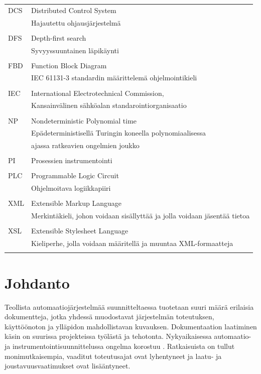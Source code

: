 \documentclass[finnish,12pt]{article}
\begin{document}
	\begin{tabular}{ll}	     	    
DCS	& Distributed Control System \\
	& Hajautettu ohjausjärjestelmä \\ \\
DFS	& Depth-first search\\
	& Syvyyssuuntainen läpikäynti \\\\

FBD	& Function Block Diagram\\
	& IEC 61131-3 standardin määrittelemä ohjelmointikieli\\\\
IEC	& International Electrotechnical Commission,\\
	& Kansainvälinen sähköalan standarointiorganisaatio\\\\
NP & Nondeterministic Polynomial time\\
	& Epädeterministisellä Turingin koneella polynomiaalisessa\\&ajassa ratkeavien ongelmien joukko \\\\ 
PI	& Prosessien instrumentointi\\\\
PLC	& Programmable Logic Circuit \\
	& Ohjelmoitava logiikkapiiri\\\\
XML	& Extensible Markup Language\\
	& Merkintäkieli, johon voidaan sisällyttää ja jolla voidaan jäsentää tietoa  \\\\
XSL	& Extensible Stylesheet Language\\
	& Kieliperhe, jolla voidaan määritellä ja muuntaa XML-formaatteja\\\\

\end{tabular}

	\cleardoublepage
	\storeinipagenumber
	\setcounter{page}{1}


	\section{Johdanto}
	\thispagestyle{empty}

Teollista automaatiojärjestelmää suunnitteltaessa tuotetaan suuri määrä erilaisia dokumentteja, jotka
yhdessä muodostavat järjestelmän toteutuksen, käyttöönoton ja ylläpidon mahdollistavan kuvauksen.
Dokumentaation laatiminen käsin on suurissa projekteissa työlästä ja tehotonta.
Nykyaikaisessa automaatio- ja instrumentointisuunnittelussa ongelma korostuu \cite{RefWorks:41}.
Ratkaisuista on tullut monimutkaisempia, vaaditut toteutusajat ovat lyhentyneet ja laatu- ja joustavuusvaatimukset ovat lisääntyneet.
\end{document}
